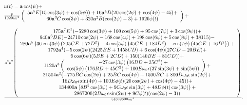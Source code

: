 \documentclass{ws-ijbc}
\begin{document}
\begin{equation}
\begin{array}{l}
u(t)=\mathbf{a}\cos (\psi )+ \\ 
\frac{p}{1920\text{$\mathbf{\omega }_{0}$}^{2}}\left( 
\begin{array}{c}
5\mathbf{a}^{5}E(15\cos (3\psi )+\cos (5\psi ))+16\mathbf{a}^{4}D(20\cos
(2\psi )+\cos (4\psi )-45)+ \\ 
60\mathbf{a}^{3}C\cos (3\psi )+320\mathbf{a}^{2}B(\cos (2\psi )-3)+1920\phi
(t)%
\end{array}%
\right) + \\ 
\\ 
\frac{\mathbf{a}^{2}p^{2}\left( 
\begin{array}{c}
175\mathbf{a}^{7}E^{2}(-5280\cos (3\psi )+160\cos (5\psi )+95\cos (7\psi
)+3\cos (9\psi ))+ \\ 
640\mathbf{a}^{6}DE(-24710\cos (2\psi )-168\cos (4\psi )+198\cos (6\psi
)+5\cos (8\psi )+38115)- \\ 
280\mathbf{a}^{5}\left( 36\cos (3\psi )\left( 205CE+72D^{2}\right) -4\cos
(5\psi )\left( 45CE+184D^{2}\right) -\cos (7\psi )\left( 45CE+16D^{2}\right)
\right) + \\ 
1792\mathbf{a}^{4}(-5\cos (2\psi )(2425BE+1458CD)+6\cos (4\psi )(27CD-20BE)+
\\ 
9\cos (6\psi )(5BE+2CD)+150(140BE+81CD))+ \\ 
1120\mathbf{a}^{3}\left( 
\begin{array}{c}
-27\cos (3\psi )\left( 16BD+35C^{2}\right) + \\ 
\cos (5\psi )\left( 176BD+45C^{2}\right) +100E\text{$\mathbf{\omega }_{0}$}%
\epsilon (27\sin (3\psi )+\sin (5\psi ))%
\end{array}%
\right) + \\ 
21504\mathbf{a}^{2}(-775BC\cos (2\psi )+25BC\cos (4\psi )+1500BC+800D\text{$%
\mathbf{\omega }_{0}$}\epsilon \sin (2\psi )+ \\ 
16D\text{$\mathbf{\omega }_{0}$}\epsilon \sin (4\psi )+100E\phi (t)(20\cos
(2\psi )+\cos (4\psi )-45))+ \\ 
134400\mathbf{a}\left( 8B^{2}\cos (3\psi )+9C\text{$\mathbf{\omega }_{0}$}%
\epsilon \sin (3\psi )+48D\phi (t)\cos (3\psi )\right) + \\ 
2867200(2B\text{$\mathbf{\omega }_{0}$}\epsilon \sin (2\psi )+9C\phi
(t)(\cos (2\psi )-3))%
\end{array}%
\right) }{51609600\text{$\mathbf{\omega }_{0}$}^{4}}. \\ 
\\ 

\end{array}
\end{equation}
\end{document}
